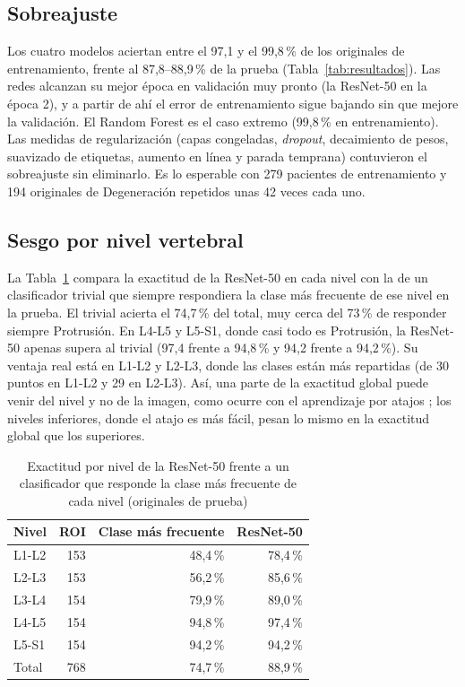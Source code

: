 \subsection{Sobreajuste}
\label{sec:res_sobreajuste}
Los cuatro modelos aciertan entre el 97,1 y el 99,8\,\% de los originales de entrenamiento, frente al 87,8--88,9\,\% de la prueba (Tabla~\ref{tab:resultados}). Las redes alcanzan su mejor época en validación muy pronto (la ResNet-50 en la época 2), y a partir de ahí el error de entrenamiento sigue bajando sin que mejore la validación. El Random Forest es el caso extremo (99,8\,\% en entrenamiento). Las medidas de regularización (capas congeladas, \emph{dropout}, decaimiento de pesos, suavizado de etiquetas, aumento en línea y parada temprana) contuvieron el sobreajuste sin eliminarlo. Es lo esperable con 279 pacientes de entrenamiento y 194 originales de Degeneración repetidos unas 42 veces cada uno.

\subsection{Sesgo por nivel vertebral}
\label{sec:res_nivel}
La Tabla~\ref{tab:nivelres} compara la exactitud de la ResNet-50 en cada nivel con la de un clasificador trivial que siempre respondiera la clase más frecuente de ese nivel en la prueba. El trivial acierta el 74,7\,\% del total, muy cerca del 73\,\% de responder siempre Protrusión. En L4-L5 y L5-S1, donde casi todo es Protrusión, la ResNet-50 apenas supera al trivial (97,4 frente a 94,8\,\% y 94,2 frente a 94,2\,\%). Su ventaja real está en L1-L2 y L2-L3, donde las clases están más repartidas (de 30 puntos en L1-L2 y 29 en L2-L3). Así, una parte de la exactitud global puede venir del nivel y no de la imagen, como ocurre con el aprendizaje por atajos \cite{onglt2024}; los niveles inferiores, donde el atajo es más fácil, pesan lo mismo en la exactitud global que los superiores.

\begin{table}[!htb]
\centering\footnotesize
\caption{Exactitud por nivel de la ResNet-50 frente a un clasificador que responde la clase más frecuente de cada nivel (originales de prueba)}
\label{tab:nivelres}
\begin{tabular}{lrrr}
\toprule
Nivel & ROI & Clase más frecuente & ResNet-50 \\
\midrule
L1-L2 & 153 & 48,4\,\% & 78,4\,\% \\
L2-L3 & 153 & 56,2\,\% & 85,6\,\% \\
L3-L4 & 154 & 79,9\,\% & 89,0\,\% \\
L4-L5 & 154 & 94,8\,\% & 97,4\,\% \\
L5-S1 & 154 & 94,2\,\% & 94,2\,\% \\
\midrule
Total & 768 & 74,7\,\% & 88,9\,\% \\
\bottomrule
\end{tabular}
\end{table}

